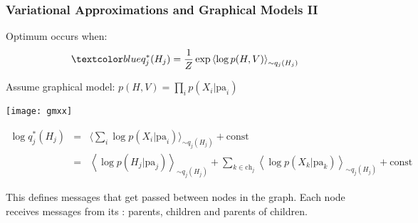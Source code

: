 \begin{frame}
\frametitle{Variational Approximations and Graphical Models II}


\parbox{3in}{
Optimum  occurs when: 
\[
\Blue{q^*_j(H_j) = \frac{1}{Z} \exp \left\langle \log p(H,V)
\right\rangle_{\sim q_j(H_j)}}
\]

Assume graphical model: $p(H,V) = \prod_i p(X_i|\mbox{pa}_i)$
}
\parbox{1.8in}{
\centerline{\texttt{[image: gmxx]}}
}

\begin{eqnarray*}
\log q^*_j(H_j) &=& \Big\langle \sum_i \log p(X_i|\mbox{pa}_i)
\Big\rangle_{\sim q_j(H_j)} + \mbox{const} \\
&=&  \left\langle \log p(H_j|\mbox{pa}_j) \right\rangle_{\sim
q_j(H_j)} + \sum_{k \in \mbox{ch}_j } \left\langle \log
p(X_k|\mbox{pa}_k) \right\rangle_{\sim q_j(H_j)}
+ \mbox{const} 
\end{eqnarray*}

This defines messages that get passed between nodes in the graph. Each
node receives messages from its : parents,
children and parents of children. \\[1ex]

\centerline{}

\end{frame}
